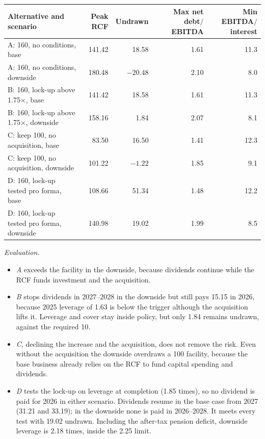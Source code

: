 \begin{qfexample}
\begin{center}\small
\begin{tabular}{@{}lrrrr@{}}
\toprule
Alternative and scenario & Peak RCF & Undrawn & Max net debt$/$EBITDA & Min EBITDA$/$interest\\
\midrule
A: 160, no conditions, base & 141.42 & 18.58 & 1.61 & 11.3\\
A: 160, no conditions, downside & 180.48 & $-20.48$ & 2.10 & 8.0\\
B: 160, lock-up above 1.75$\times$, base & 141.42 & 18.58 & 1.61 & 11.3\\
B: 160, lock-up above 1.75$\times$, downside & 158.16 & 1.84 & 2.07 & 8.1\\
C: keep 100, no acquisition, base & 83.50 & 16.50 & 1.41 & 12.3\\
C: keep 100, no acquisition, downside & 101.22 & $-1.22$ & 1.85 & 9.1\\
D: 160, lock-up tested pro forma, base & 108.66 & 51.34 & 1.48 & 12.2\\
D: 160, lock-up tested pro forma, downside & 140.98 & 19.02 & 1.99 & 8.5\\
\bottomrule
\end{tabular}
\end{center}

\emph{Evaluation.}
\begin{itemize}
\item \emph{A} exceeds the facility in the downside, because dividends continue while the RCF funds investment and the acquisition.
\item \emph{B} stops dividends in 2027--2028 in the downside but still pays 15.15 in 2026, because 2025 leverage of 1.63 is below the trigger although the acquisition lifts it. Leverage and cover stay inside policy, but only 1.84 remains undrawn, against the required 10.
\item \emph{C}, declining the increase and the acquisition, does not remove the risk. Even without the acquisition the downside overdraws a 100 facility, because the base business already relies on the RCF to fund capital spending and dividends.
\item \emph{D} tests the lock-up on leverage at completion (1.85 times), so no dividend is paid for 2026 in either scenario. Dividends resume in the base case from 2027 (31.21 and 33.19); in the downside none is paid in 2026--2028. It meets every test with 19.02 undrawn. Including the after-tax pension deficit, downside leverage is 2.18 times, inside the 2.25 limit.
\end{itemize}


\end{qfexample}
